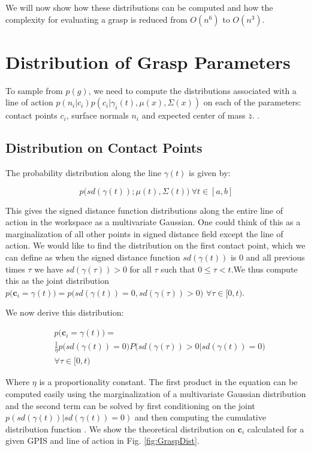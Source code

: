 \documentclass[letterpaper, 10 pt, conference]{ieeeconf}  %
\begin{document}
We will now show how these distributions can be computed and how the complexity for evaluating a grasp is reduced from $O(n^6)$ to $O(n^3)$. 


\section{Distribution of Grasp Parameters}
\label{sec:distgrasp}
 
 To sample from $p(g)$, we need to compute the distributions associated with a line of action $p(n_i|c_i)p(c_i|\gamma_i(t),\mu(x),\Sigma(x))$ on each of the parameters: contact points $c_i$, surface normals $n_i$  and expected center of mass $\bar{z}$. 
 .
\subsection{Distribution on Contact Points} 
The probability distribution along the line $\gamma(t)$ is given by:

\vspace{-2ex}
\begin{equation} \label{eq:line_of_act_dist}
p\big(sd(\gamma(t)) ; \mu(t),\Sigma(t)\big) \ \forall t \in [a,b] 
\end{equation}

This gives the signed distance function distributions along the entire line of action in the workspace as a multivariate Gaussian. One could think of this as a marginalization of all other points in signed distance field except the line of action. We would like to find the distribution on the first contact point, which we can define as when the signed distance function $sd(\gamma(t))$ is $0$ and all previous times $\tau$ we have $sd(\gamma(\tau)) > 0$ for all $\tau$ such that $0 \leq \tau < t$.We thus compute this as the joint distribution $p\big( \textbf{c}_i= \gamma(t)\big) = p\big(sd(\gamma(t))=0, sd(\gamma(\tau))> 0 \big)$ $  \forall \tau \in [0,t)$.

We now derive this distribution: 

\vspace{-2ex}
\begin{align}
 & p\big(\textbf{c}_i = \gamma(t)\big) = \label{eq:contact_theory} \\
  & \frac{1}{\eta} p\big(sd(\gamma(t)) = 0\big)P\big(sd(\gamma(\tau)) > 0 | sd(\gamma(t)) = 0\big) \\
  & \forall \tau \in [0,t)
\end{align}


Where $\eta$ is a proportionality constant. The first product in the equation can be computed easily using the marginalization of a multivariate Gaussian distribution and the second term can be solved by first conditioning on the joint $p(sd(\gamma(t))|sd(\gamma(t)) = 0)$ and then computing the cumulative distribution function  \cite{petersen2008matrix}.  We show the theoretical distribution on $\textbf{c}_i$ calculated for a given GPIS and line of action in Fig.
\ref{fig:GraspDist}.
\end{document}
